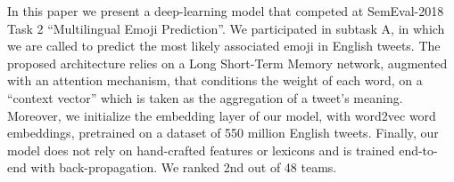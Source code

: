 In this paper we present a deep-learning model that competed at SemEval-2018 Task 2 ``Multilingual Emoji Prediction''. We participated in subtask A, in which we are called to predict the most likely associated emoji in English tweets. The proposed architecture relies on a Long Short-Term Memory network, augmented with an attention mechanism, that conditions the weight of each word, on a ``context vector'' which is taken as the aggregation of a tweet's meaning. Moreover, we initialize the embedding layer of our model, with word2vec word embeddings, pretrained on a dataset of 550 million English tweets. Finally, our model does not rely on hand-crafted features or lexicons and is trained end-to-end with back-propagation. We ranked 2nd out of 48 teams.
